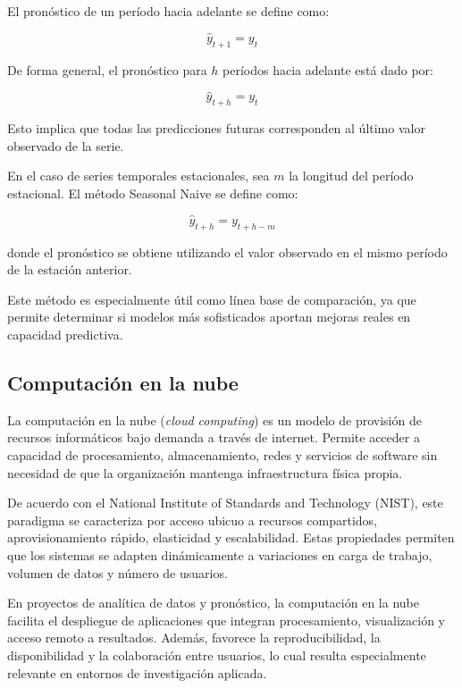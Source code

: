 El pronóstico de un período hacia adelante se define como:

\begin{equation}
	\hat{y}_{t+1} = y_t
\end{equation}

De forma general, el pronóstico para \(h\) períodos hacia adelante está dado por:

\begin{equation}
	\hat{y}_{t+h} = y_t
\end{equation}

Esto implica que todas las predicciones futuras corresponden al último valor observado de la serie.

En el caso de series temporales estacionales, sea \(m\) la longitud del período estacional. El método Seasonal Naive se define como:

\begin{equation}
	\hat{y}_{t+h} = y_{t+h-m}
\end{equation}

donde el pronóstico se obtiene utilizando el valor observado en el mismo período de la estación anterior.

Este método es especialmente útil como línea base de comparación, ya que permite determinar si modelos más sofisticados aportan mejoras reales en capacidad predictiva.

\subsection{Computación en la nube}


La computación en la nube (\textit{cloud computing}) es un modelo de provisión de recursos informáticos bajo demanda a través de internet. Permite acceder a capacidad de procesamiento, almacenamiento, redes y servicios de software sin necesidad de que la organización mantenga infraestructura física propia.

De acuerdo con el National Institute of Standards and Technology (NIST), este paradigma se caracteriza por acceso ubicuo a recursos compartidos, aprovisionamiento rápido, elasticidad y escalabilidad. Estas propiedades permiten que los sistemas se adapten dinámicamente a variaciones en carga de trabajo, volumen de datos y número de usuarios.

En proyectos de analítica de datos y pronóstico, la computación en la nube facilita el despliegue de aplicaciones que integran procesamiento, visualización y acceso remoto a resultados. Además, favorece la reproducibilidad, la disponibilidad y la colaboración entre usuarios, lo cual resulta especialmente relevante en entornos de investigación aplicada.


